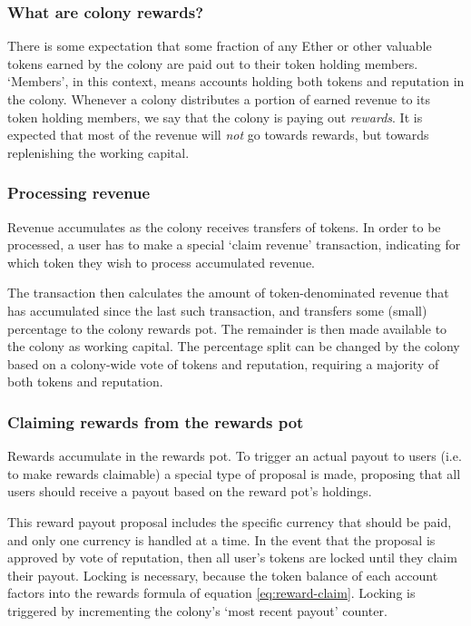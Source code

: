 \subsubsection*{What are colony rewards?}

There is some expectation that some fraction of any Ether or other valuable tokens earned by the colony are paid out to their token holding members. `Members', in this context, means accounts holding both tokens and reputation in the colony. Whenever a colony distributes a portion of earned revenue to its token holding members, we say that the colony is paying out \emph{rewards}. It is expected that most of the revenue will \emph{not} go towards rewards, but towards replenishing the working capital.

\subsubsection{Processing revenue}

Revenue accumulates as the colony receives transfers of tokens. In order to be processed, a user has to make a special `claim revenue' transaction, indicating for which token they wish to process accumulated revenue.

The transaction then calculates the amount of token-denominated revenue that has accumulated since the last such transaction, and transfers some (small) percentage to the colony rewards pot. The remainder is then made available to the colony as working capital. The percentage split can be changed by the colony based on a colony-wide vote of tokens and reputation, requiring a majority of both tokens and reputation.

\subsubsection{Claiming rewards from the rewards pot}\label{sec:claimrewards}

Rewards accumulate in the rewards pot. To trigger an actual payout to users (i.e. to make rewards claimable) a special type of proposal is made, proposing that all users should receive a payout based on the reward pot's holdings.

This reward payout proposal includes the specific currency that should be paid, and only one currency is handled at a time. In the event that the proposal is approved by vote of reputation, then all user's tokens are locked until they claim their payout. Locking is necessary, because the token balance of each account factors into the rewards formula of equation \eqref{eq:reward-claim}. Locking is triggered by incrementing the colony's `most recent payout' counter.

